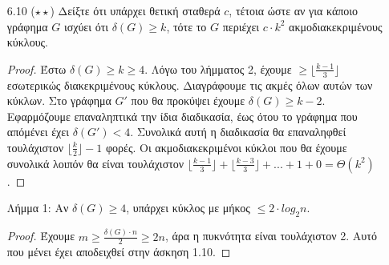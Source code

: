 \documentclass[a4paper, oneside, 11pt]{article}
\theoremstyle{definition}
\begin{document}
\begin{enumerate}
Λήμμα 1: Υπάρχει 1-1 και επί συνάρτηση από το σύνολο $A$ στο σύνολο $B$.
\begin{proof}
Για κάθε ζευγάρι κορυφών $i$, $j$ με $i\neq j$, ορίζουμε $P_{ij}$ ένα μονοπάτι μεταξύ τους στο $G$. Αυτό προφανώς υπάρχει, αφού το $G$ είναι συνεκτικό.
Ορισμός $f$: Έστω $Z\in A$ και $T$ το σύνολο των κορυφών του $Z$ με περιττό βαθμό. Είναι γνωστό ότι $|Z|\text{mod} 2=0$. Διαμερίζουμε τις κορυφές του $Z$ σε ζευγάρια
$(a_i, b_i)$ (με κάποιο μονοσήμαντο τρόπο, πχ αριθμούμε τις κορυφές του $Z$ $u_1,u_2,...,u_k$ και βάζουμε τα ζευγάρια $(u_1,u_2), ..., (u_{k-1},u_k)$)
και για κάθε ζευγάρι θεωρούμε το μονοπάτι $P_{a_i b_i}$. Για κάθε ακμή πάνω σε αυτό το μονοπάτι, αν υπάρχει στο $Z$ τότε την αφαιρούμε, ενώ αν δεν
υπάρχει την προσθέτουμε. Είναι εύκολο να δούμε ότι αυτός ο μετασχηματισμός διατηρεί την αρτιότητα των βαθμών των ενδιάμεσων κόμβων, και επίσης πλέον οι $a_i$, $b_i$
έχουν άρτιο βαθμό. Κάνοντας αυτό το μετασχηματισμό για κάθε ζευγάρι, θα καταλήξουμε με ένα άρτιο γράφημα $U$. Ορίζουμε $f(Z)=U\times T$. Ουσιαστικά η $f$ μετασχηματίζει ένα
γράφημα σε άρτιο, αλλά επιστρέφει και την πληροφορία του ποιοι κόμβοι ήταν περιττοί. Αντίστροφα, αν έχουμε ένα άρτιο γράφημα $U$ και ένα υποσύνολο $T$ του $V(G)$ με άρτιο πληθάριθμο,
θεωρούμε τη διαμέριση του $T$ σε ζευγάρια και για κάθε ζευγάρι εφαρμόζουμε τον ίδιο μετασχηματισμό που ορίσαμε παραπάνω. Έτσι θα πάρουμε ξανά το γράφημα $Z$ με $f(Z)=U\times T$.
Συνεπώς η $f$ είναι 1-1 και επί.
\end{proof}

\item[6.10 ($\star\star$)]
	Δείξτε ότι υπάρχει θετική σταθερά $c$, τέτοια ώστε αν για κάποιο γράφημα $G$ ισχύει ότι $\delta (G)\geq k$, τότε το $G$ περιέχει $c\cdot k^2$ ακμοδιακεκριμένους κύκλους.

\begin{proof}
Έστω $\delta(G)\geq k\geq 4$. Λόγω του λήμματος 2, έχουμε $\geq \lfloor \frac{k-1}{3}\rfloor$ εσωτερικώς διακεκριμένους κύκλους. Διαγράφουμε τις ακμές όλων αυτών των κύκλων. Στο γράφημα
$G'$ που θα προκύψει έχουμε $\delta(G)\geq k-2$. Εφαρμόζουμε επαναληπτικά την ίδια διαδικασία, έως ότου το γράφημα που απόμένει έχει $\delta(G')<4$. Συνολικά αυτή η διαδικασία θα επαναληφθεί
τουλάχιστον $\lfloor\frac{k}{2}\rfloor -1$ φορές. Οι ακμοδιακεκριμένοι κύκλοι που θα έχουμε συνολικά λοιπόν θα είναι τουλάχιστον $\lfloor \frac{k-1}{3}\rfloor + \lfloor \frac{k-3}{3}\rfloor + ... + 1 + 0 = \Theta (k^2)$.
\end{proof}

Λήμμα 1: Αν $\delta(G)\geq 4$, υπάρχει κύκλος με μήκος $\leq 2\cdot log_2 n$.
\begin{proof}
Έχουμε $m\geq \frac{\delta(G)\cdot n}{2}\geq 2n$, άρα η πυκνότητα είναι τουλάχιστον 2. Αυτό που μένει έχει αποδειχθεί στην άσκηση 1.10.
\end{proof}


\end{enumerate}
\end{document}
